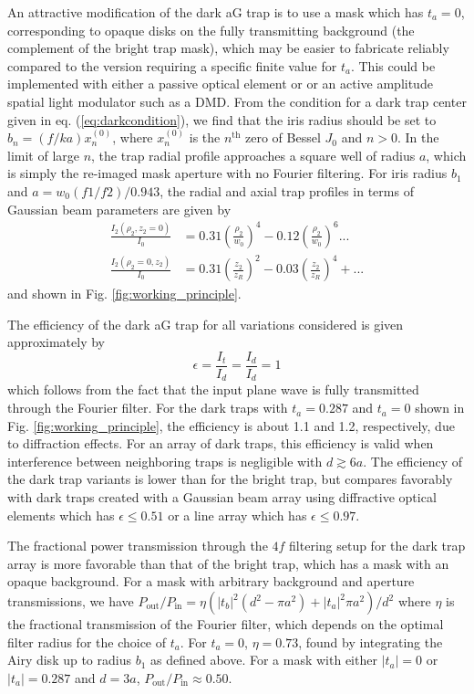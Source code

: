 An attractive modification of the dark aG trap is to use a mask which has $t_a=0$, corresponding to opaque disks on the fully transmitting background (the complement of the bright trap mask), which may be easier to fabricate reliably compared to the version requiring a specific finite value for $t_a$. This could be implemented with either a passive optical element or or an active amplitude spatial light modulator such as a DMD. From the condition for a dark trap center given in eq. (\ref{eq:darkcondition}), we find that the iris radius should be set to $b_n=(f/ka)x_n^{(0)}$, where $x_n^{(0)}$ is the $n^{\text {th}}$ zero of Bessel $J_0$ and $n>0$. In the limit of large $n$, the trap radial profile   approaches a square well of radius $a$, which is simply the re-imaged mask aperture with no Fourier filtering. For iris radius $b_1$ and $a=w_0(f1/f2)/0.943$, the radial and axial trap profiles in terms of Gaussian beam parameters are given by
\begin{equation} \label{eq:Iag_dark3}
    \begin{aligned}
    \frac{I_2(\rho_2,z_2=0)}{I_0} &= 0.31 \left(\frac{\rho_2}{w_0}\right)^4 - 0.12 \left(\frac{\rho_2}{w_0}\right)^6... \\
    \frac{I_2(\rho_2=0,z_2)}{I_0} &= 0.31 \left(\frac{z_2}{z_R}\right)^2 - 0.03 \left(\frac{z_2}{z_R}\right)^4 + ...
    \end{aligned}
\end{equation}
and  shown in Fig. \ref{fig:working_principle}. 

The efficiency of the dark aG trap for all variations considered is given approximately by
\begin{equation}
\epsilon=\frac{I_{t}}{I_{d}}=\frac{I_{d}}{I_{d}}=1
\end{equation}
which follows from the fact that the input plane wave is fully transmitted through the Fourier filter. For the dark traps with $t_a=0.287$ and $t_a=0$ shown in Fig. \ref{fig:working_principle}, the efficiency is about 1.1 and 1.2, respectively, due to diffraction effects. For an array of dark traps, this efficiency is valid when interference between neighboring traps is negligible with $d\gtrsim6a$. The efficiency of the dark trap variants is lower than for the bright trap, but compares favorably with dark traps created with a Gaussian beam array using diffractive optical elements which has $\epsilon \leq 0.51$\cite{Piotrowicz2013} or a line array which
has $\epsilon \leq 0.97$\cite{Saffmanlines}.

The fractional power transmission through the $4f$ filtering setup for the dark trap array is more favorable than that of the bright trap, which has a mask with an opaque background. For a mask with arbitrary background and aperture transmissions, we have $P_{\text {out}}/P_{\text {in}} = \eta(|t_b|^2(d^2 - \pi a^2) + |t_a|^2 \pi a^2)/d^2$ where $\eta$ is the fractional transmission of the Fourier filter, which depends on the optimal filter radius for the choice of $t_a$. For $t_a=0$,  $\eta=0.73$, found by integrating the Airy disk up to radius $b_1$ as defined above. For a mask with either $|t_a|=0$ or  $|t_a|=0.287$ and $d=3a$, $P_{\text {out}}/P_{\text {in}}\approx 0.50$.

